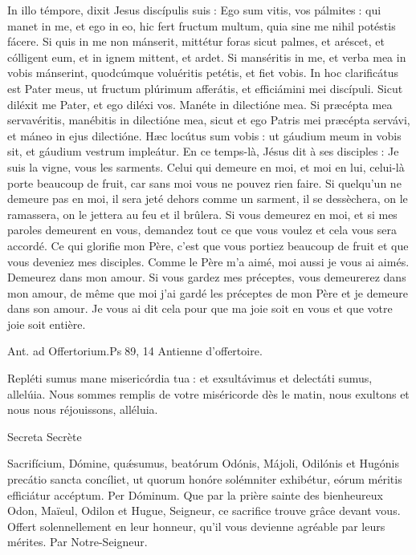 \begin{paracol}{2}
In illo témpore, dixit Jesus discípulis  suis : Ego sum vitis, vos pálmites : qui manet in me, et ego in eo, hic fert fructum multum, quia sine me nihil potéstis fácere. Si quis in me non mánserit, mittétur foras sicut palmes, et aréscet, et cólligent eum, et in ignem mittent, et ardet. Si manséritis in me, et verba mea in vobis mánserint, quodcúmque voluéritis petétis, et fiet vobis. In hoc clarificátus est Pater meus, ut fructum plúrimum afferátis, et efficiámini mei discípuli. Sicut diléxit me Pater, et ego diléxi vos. Manéte in dilectióne mea. Si præcépta mea servavéritis, manébitis in dilectióne mea, sicut et ego Patris mei præcépta servávi, et máneo in ejus dilectióne. Hæc locútus sum vobis : ut gáudium meum in vobis sit, et gáudium vestrum impleátur.
\switchcolumn
En ce temps-là, Jésus dit à ses disciples :  Je suis la vigne, vous les sarments. Celui qui demeure en moi, et moi en lui, celui-là porte beaucoup de fruit, car sans moi vous ne pouvez rien faire. Si quelqu’un ne demeure pas en moi, il sera jeté dehors comme un sarment, il se dessèchera, on le ramassera, on le jettera au feu et il brûlera. Si vous demeurez en moi, et si mes paroles demeurent en vous, demandez tout ce que vous voulez et cela vous sera accordé. Ce qui glorifie mon Père, c’est que vous portiez beaucoup de fruit et que vous deveniez mes disciples. Comme le Père m’a aimé, moi aussi je vous ai aimés. Demeurez dans mon amour. Si vous gardez mes préceptes, vous demeurerez dans mon amour, de même que moi j’ai gardé les préceptes de mon Père et je demeure dans son amour. Je vous ai dit cela pour que ma joie soit en vous et que votre joie soit entière.
\switchcolumn*

Ant. ad Offertorium.\hfill Ps 89, 14
\switchcolumn
Antienne d’offertoire.
\switchcolumn*

Repléti sumus mane misericórdia tua : et exsultávimus et delectáti sumus, allelúia.
\switchcolumn
Nous sommes remplis de votre miséricorde dès le matin, nous exultons et nous nous réjouissons, alléluia.
\switchcolumn*

Secreta
\switchcolumn
Secrète
\switchcolumn*

Sacrifícium, Dómine, quǽsumus,  beatórum Odónis, Májoli, Odilónis et Hugónis precátio sancta concíliet, ut quorum honóre solémniter exhibétur, eórum méritis efficiátur accéptum. Per Dóminum.
\switchcolumn
Que par la prière sainte des bienheureux  Odon, Maïeul, Odilon et Hugue, Seigneur, ce sacrifice trouve grâce devant vous. Offert solennellement en leur honneur, qu’il vous devienne agréable par leurs mérites. Par Notre-Seigneur.
\switchcolumn*


\end{paracol}
